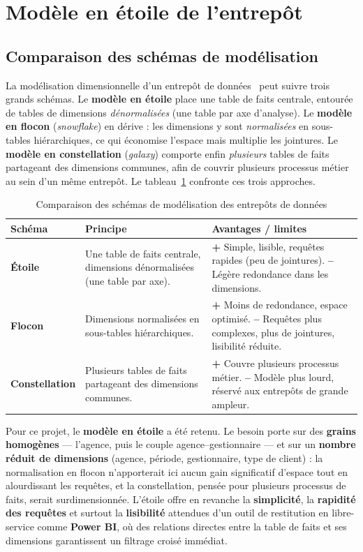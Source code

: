 \section{Modèle en étoile de l'entrepôt}

\subsection{Comparaison des schémas de modélisation}
La modélisation dimensionnelle d'un entrepôt de données~\cite{kimball2013dwh} peut
suivre trois grands schémas. Le \textbf{modèle en étoile} place une table de faits
centrale, entourée
de tables de dimensions \emph{dénormalisées} (une table par axe d'analyse). Le
\textbf{modèle en flocon} (\emph{snowflake}) en dérive : les dimensions y sont
\emph{normalisées} en sous-tables hiérarchiques, ce qui économise l'espace mais
multiplie les jointures. Le \textbf{modèle en constellation} (\emph{galaxy})
comporte enfin \emph{plusieurs} tables de faits partageant des dimensions communes,
afin de couvrir plusieurs processus métier au sein d'un même entrepôt. Le
tableau~\ref{tab:schemas_dw} confronte ces trois approches.

\begin{table}[htbp]
\centering
\caption{Comparaison des schémas de modélisation des entrepôts de données}
\label{tab:schemas_dw}
\renewcommand{\arraystretch}{1.3}
\begin{tabularx}{\textwidth}{|>{\bfseries}p{2.8cm}|X|X|}
\hline
\textmd{\textbf{Schéma}} & \textbf{Principe} & \textbf{Avantages / limites}\\
\hline
Étoile & Une table de faits centrale, dimensions dénormalisées (une table par
axe). & \textbf{+} Simple, lisible, requêtes rapides (peu de jointures). \textbf{--}
Légère redondance dans les dimensions.\\
\hline
Flocon & Dimensions normalisées en sous-tables hiérarchiques. & \textbf{+} Moins de
redondance, espace optimisé. \textbf{--} Requêtes plus complexes, plus de jointures,
lisibilité réduite.\\
\hline
Constellation & Plusieurs tables de faits partageant des dimensions communes. &
\textbf{+} Couvre plusieurs processus métier. \textbf{--} Modèle plus lourd,
réservé aux entrepôts de grande ampleur.\\
\hline
\end{tabularx}
\end{table}

Pour ce projet, le \textbf{modèle en étoile} a été retenu. Le besoin porte sur des
\textbf{grains homogènes} --- l'agence, puis le couple agence--gestionnaire --- et
sur un \textbf{nombre réduit de dimensions} (agence, période, gestionnaire, type
de client) : la normalisation
en flocon n'apporterait ici aucun gain significatif d'espace tout en alourdissant
les requêtes, et la constellation, pensée pour plusieurs processus de faits, serait
surdimensionnée. L'étoile offre en revanche la \textbf{simplicité}, la
\textbf{rapidité des requêtes} et surtout la \textbf{lisibilité} attendues d'un
outil de restitution en libre-service comme \textbf{Power BI}, où des relations
directes entre la table de faits et ses dimensions garantissent un filtrage croisé
immédiat.

